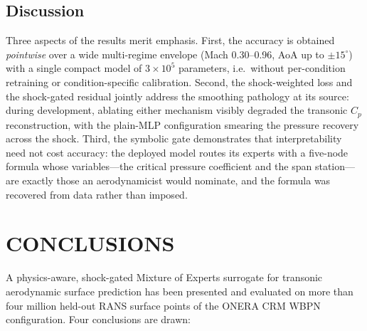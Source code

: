 \documentclass{WCCM-ECCOMAS_2026_Full_Paper}
\begin{document}
\subsection{Discussion}

Three aspects of the results merit emphasis.  First, the accuracy is
obtained \emph{pointwise} over a wide multi-regime envelope (Mach
0.30--0.96, AoA up to $\pm 15^{\circ}$) with a single compact model of
$3\times 10^{5}$ parameters, i.e.\ without per-condition retraining
or condition-specific calibration.  Second, the shock-weighted loss
and the shock-gated residual jointly address the smoothing pathology
at its source: during development, ablating either mechanism visibly
degraded the transonic $C_p$ reconstruction, with the plain-MLP
configuration smearing the pressure recovery across the shock.
Third, the symbolic gate demonstrates that interpretability need not
cost accuracy: the deployed model routes its experts with a five-node
formula whose variables---the critical pressure coefficient and the
span station---are exactly those an aerodynamicist would nominate,
and the formula was recovered from data rather than imposed.

\section{CONCLUSIONS}
\label{sec:conclusions}

A physics-aware, shock-gated Mixture of Experts surrogate for
transonic aerodynamic surface prediction has been presented and
evaluated on more than four million held-out RANS surface points of
the ONERA CRM WBPN configuration.  Four conclusions are drawn:
\end{document}
